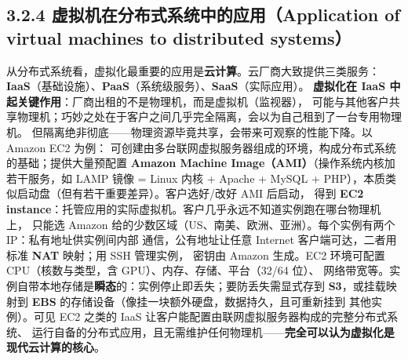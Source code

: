 \begin{closeread}
\end{closeread}


\subsection*{3.2.4 虚拟机在分布式系统中的应用（Application of virtual machines to distributed systems）}
从分布式系统看，虚拟化最重要的应用是\textbf{云计算}。云厂商大致提供三类服务：
\textbf{IaaS}（基础设施）、\textbf{PaaS}（系统级服务）、\textbf{SaaS}（实际应用）。
\textbf{虚拟化在 IaaS 中起关键作用}：厂商出租的不是物理机，而是虚拟机（监视器），
可能与其他客户共享物理机；巧妙之处在于客户之间几乎完全隔离，会以为自己租到了一台专用物理机。
但隔离绝非彻底——物理资源毕竟共享，会带来可观察的性能下降。以 Amazon EC2 为例：
可创建由多台联网虚拟服务器组成的环境，构成分布式系统的基础；提供大量预配置
\textbf{Amazon Machine Image（AMI）}（操作系统内核加若干服务，如 LAMP 镜像 = Linux 内核 +
Apache + MySQL + PHP），本质类似启动盘（但有若干重要差异）。客户选好/改好 AMI 后启动，
得到 \textbf{EC2 instance}：托管应用的实际虚拟机。客户几乎永远不知道实例跑在哪台物理机上，
只能选 Amazon 给的少数区域（US、南美、欧洲、亚洲）。每个实例有两个 IP：私有地址供实例间内部
通信，公有地址让任意 Internet 客户端可达，二者用标准 \textbf{NAT} 映射；用 SSH 管理实例，
密钥由 Amazon 生成。EC2 环境可配置 CPU（核数与类型，含 GPU）、内存、存储、平台（32/64 位）、
网络带宽等。实例自带本地存储是\textbf{瞬态}的：实例停止即丢失；要防丢失需显式存到
\textbf{S3}，或挂载映射到 \textbf{EBS} 的存储设备（像挂一块额外硬盘，数据持久，且可重新挂到
其他实例）。可见 EC2 之类的 IaaS 让客户能配置由联网虚拟服务器构成的完整分布式系统、
运行自备的分布式应用，且无需维护任何物理机——\textbf{完全可以认为虚拟化是现代云计算的核心}。

\begin{closeread}
\end{closeread}

